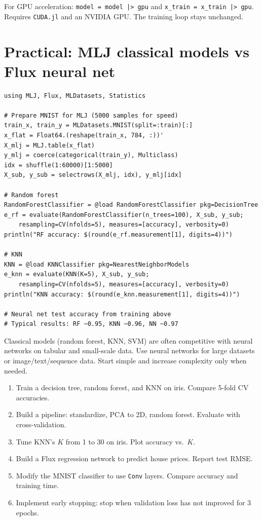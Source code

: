 \begin{performancetip}
For GPU acceleration: \texttt{model = model |> gpu} and \texttt{x\_train = x\_train |> gpu}. Requires \texttt{CUDA.jl} and an NVIDIA GPU. The training loop stays unchanged.
\end{performancetip}

\section{Practical: MLJ classical models vs Flux neural net}

\begin{verbatim}
using MLJ, Flux, MLDatasets, Statistics

# Prepare MNIST for MLJ (5000 samples for speed)
train_x, train_y = MLDatasets.MNIST(split=:train)[:]
x_flat = Float64.(reshape(train_x, 784, :))'
X_mlj = MLJ.table(x_flat)
y_mlj = coerce(categorical(train_y), Multiclass)
idx = shuffle(1:60000)[1:5000]
X_sub, y_sub = selectrows(X_mlj, idx), y_mlj[idx]

# Random forest
RandomForestClassifier = @load RandomForestClassifier pkg=DecisionTree
e_rf = evaluate(RandomForestClassifier(n_trees=100), X_sub, y_sub;
    resampling=CV(nfolds=5), measures=[accuracy], verbosity=0)
println("RF accuracy: $(round(e_rf.measurement[1], digits=4))")

# KNN
KNN = @load KNNClassifier pkg=NearestNeighborModels
e_knn = evaluate(KNN(K=5), X_sub, y_sub;
    resampling=CV(nfolds=5), measures=[accuracy], verbosity=0)
println("KNN accuracy: $(round(e_knn.measurement[1], digits=4))")

# Neural net test accuracy from training above
# Typical results: RF ~0.95, KNN ~0.96, NN ~0.97
\end{verbatim}

\begin{warningbox}
Classical models (random forest, KNN, SVM) are often competitive with neural networks on tabular and small-scale data. Use neural networks for large datasets or image/text/sequence data. Start simple and increase complexity only when needed.
\end{warningbox}

\begin{exercise}
\begin{enumerate}
  \item Train a decision tree, random forest, and KNN on iris. Compare 5-fold CV accuracies.
  \item Build a pipeline: standardize, PCA to 2D, random forest. Evaluate with cross-validation.
  \item Tune KNN's $K$ from 1 to 30 on iris. Plot accuracy vs.\ $K$.
  \item Build a Flux regression network to predict house prices. Report test RMSE.
  \item Modify the MNIST classifier to use \texttt{Conv} layers. Compare accuracy and training time.
  \item Implement early stopping: stop when validation loss has not improved for 3 epochs.
\end{enumerate}
\end{exercise}

